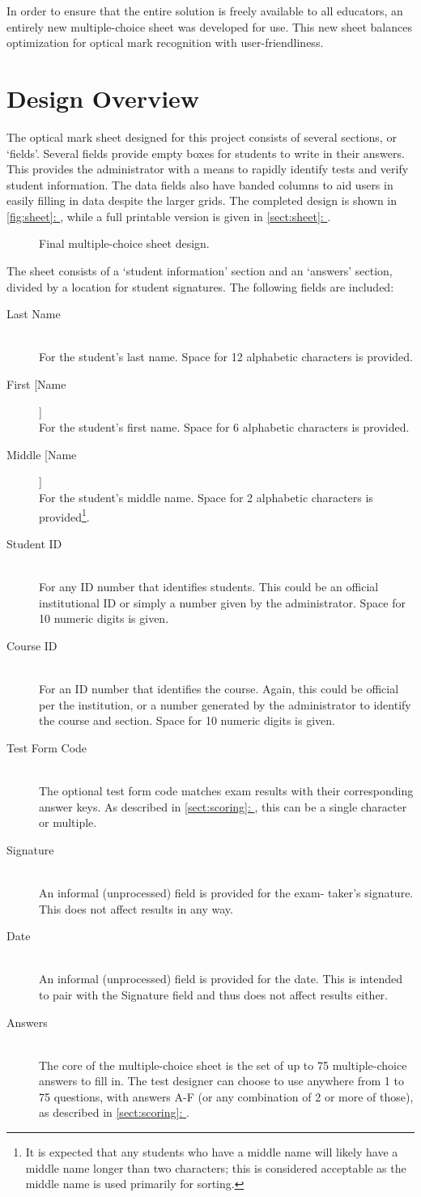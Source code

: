 \documentclass[12pt, letterpaper]{report}
\newcommand*{\sectref}[1]{\hypersetup{linkcolor=usfgreen}\hyperref[{#1}]{\ref*{#1}: \nameref*{#1}}}
\newcommand*{\itemref}[1]{\hypersetup{linkcolor=usfgreen}\hyperref[{#1}]{\autoref*{#1}: \nameref*{#1}}}
\newcommand*{\boxedimage}[1]{\fbox{\texttt{[image: \#1]}}}
\newcommand{\fig}[3]{
  \begin{figure}[h]
    \caption{#1}
    \label{#3}
    \centering
    \boxedimage{#2}
  \end{figure}
}
\newcommand*{\descitem}[1]{\item[#1] \hfill \\ }
\begin{document}
In order to ensure that the entire solution is freely available to all
educators, an entirely new multiple-choice sheet was developed for use.
This new sheet balances optimization for optical mark recognition with
user-friendliness.

\section{Design Overview}
The optical mark sheet designed for this project consists of several sections,
or `fields'. Several fields provide empty boxes for students to write in their
answers. This provides the administrator with a means to rapidly identify tests
and verify student information. The data fields
also have banded columns to aid users in easily filling in data despite the
larger grids. The completed design is shown in
\itemref{fig:sheet}, while a full printable version is given in \sectref{sect:sheet}.

\fig{Final multiple-choice sheet design.}{sheet.png}{fig:sheet}

The sheet consists of a `student information' section and an `answers' section,
divided by a location for student signatures. The following fields are
included:
\begin{description}
  \descitem{Last Name} For the student's last name. Space for 12 alphabetic
  characters is provided.
  \descitem{First [Name]} For the student's first name. Space for 6 alphabetic
  characters is provided.
  \descitem{Middle [Name]} For the student's middle name. Space for 2 alphabetic
  characters is provided\footnote{It is expected that any students who have a
  middle name will likely have a middle name longer than two characters; this
  is considered acceptable as the middle name is used primarily for sorting.}.
  \descitem{Student ID} For any ID number that identifies students. This could be an
  official institutional ID or simply a number given by the administrator. Space
  for 10 numeric digits is given.
  \descitem{Course ID} For an ID number that identifies the course. Again, this
  could be official per the institution, or a number generated by the
  administrator to identify the course and section. Space for 10 numeric digits
  is given.
  \descitem{Test Form Code} The optional test form code matches exam results with
  their corresponding answer keys. As described in \sectref{sect:scoring}, this can
  be a single character or multiple.
  \descitem{Signature} An informal (unprocessed) field is provided for the exam-
  taker's signature. This does not affect results in any way.
  \descitem{Date} An informal (unprocessed) field is provided for the date. This is
  intended to pair with the Signature field and thus does not affect results
  either.
  \descitem{Answers} The core of the multiple-choice sheet is the set of up to 75
  multiple-choice answers to fill in. The test designer can choose to use
  anywhere from 1 to 75 questions, with answers A-F (or any combination of 2 or
  more of those), as described in \sectref{sect:scoring}.
\end{description}
\end{document}
